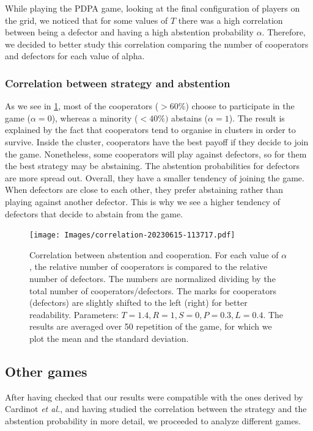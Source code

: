 \documentclass[12pt,oneside,a4paper,fleqn]{article}
\begin{document}
While playing the PDPA game, looking at the final configuration of players on the grid, we noticed that for some values of $T$ there was a high correlation between being a defector and having a high abstention probability $\alpha$. Therefore, we decided to better study this correlation comparing the number of cooperators and defectors for each value of alpha.
\subsubsection{Correlation between strategy and abstention}
As we see in \cref{fig:correlation}, most of the cooperators ($> 60 \%$) choose to participate in the game ($\alpha=0$), whereas a minority ($<40\%)$ abstains ($\alpha=1$). The result is explained by the fact that cooperators tend to organise in clusters in order to survive. Inside the cluster, cooperators have the best payoff if they decide to join the game. Nonetheless, some cooperators will play against defectors, so for them the best strategy may be abstaining.
The abstention probabilities for defectors are more spread out. Overall, they have a smaller tendency of joining the game. When defectors are close to each other, they prefer abstaining rather than playing against another defector. This is why we see a higher tendency of defectors that decide to abstain from the game.
\begin{figure}[H]
    \centering
    \texttt{[image: Images/correlation-20230615-113717.pdf]}
    \caption{Correlation between abstention and cooperation. For each value of $\alpha$, the relative number of cooperators is compared to the relative number of defectors. The numbers are normalized dividing by the total number of cooperators/defectors. The marks for cooperators (defectors) are slightly shifted to the left (right) for better readability. Parameters: $T = 1.4, R = 1, S = 0, P = 0.3, L = 0.4$. The results are averaged over 50 repetition of the game, for which we plot the mean and the standard deviation.}
    \label{fig:correlation}
\end{figure}
\subsection{Other games}
After having checked that our results were compatible with the ones derived by Cardinot \emph{et al.}, and having studied the correlation between the strategy and the abstention probability in more detail, we proceeded to analyze different games.
\end{document}
